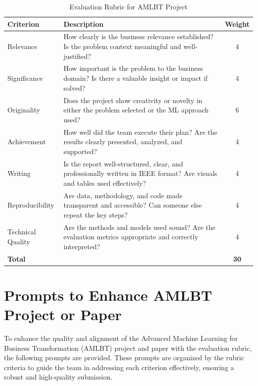 \documentclass[conference]{IEEEtran}
\begin{document}
\begin{table}[t]
    \centering
    \caption{Evaluation Rubric for AMLBT Project}
    \label{tab:rubric}
    \begin{tabular}{p{3cm} p{12cm} c}
        \toprule
        \textbf{Criterion} & \textbf{Description} & \textbf{Weight} \\
        \midrule
        Relevance  & How clearly is the business relevance established? Is the problem context meaningful and well-justified? & 4 \\
        Significance  & How important is the problem to the business domain? Is there a valuable insight or impact if solved? & 4 \\
        Originality  & Does the project show creativity or novelty in either the problem selected or the ML approach used? & 6 \\
        Achievement  & How well did the team execute their plan? Are the results clearly presented, analyzed, and supported? & 4 \\
        Writing  & Is the report well-structured, clear, and professionally written in IEEE format? Are visuals and tables used effectively? & 4 \\
        Reproducibility & Are data, methodology, and code made transparent and accessible? Can someone else repeat the key steps? & 4 \\
        Technical Quality & Are the methods and models used sound? Are the evaluation metrics appropriate and correctly interpreted? & 4 \\
        \midrule
        \textbf{Total} & & \textbf{30} \\
        \bottomrule
    \end{tabular}
\end{table}

\section{Prompts to Enhance AMLBT Project or Paper}
To enhance the quality and alignment of the Advanced Machine Learning for Business Transformation (AMLBT) project and paper with the evaluation rubric, the following prompts are provided. These prompts are organized by the rubric criteria to guide the team in addressing each criterion effectively, ensuring a robust and high-quality submission.
\end{document}
